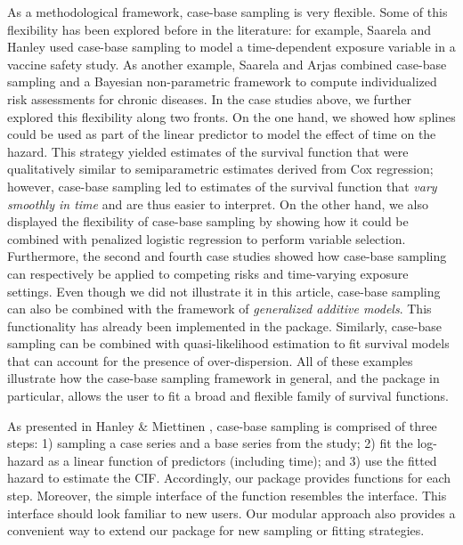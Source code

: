 As a methodological framework, case-base sampling is very flexible. Some
of this flexibility has been explored before in the literature: for
example, Saarela and Hanley \citeyearpar{saarela2015case} used case-base
sampling to model a time-dependent exposure variable in a vaccine safety
study. As another example, Saarela and Arjas
\citeyearpar{saarela2015non} combined case-base sampling and a Bayesian
non-parametric framework to compute individualized risk assessments for
chronic diseases. In the case studies above, we further explored this
flexibility along two fronts. On the one hand, we showed how splines
could be used as part of the linear predictor to model the effect of
time on the hazard. This strategy yielded estimates of the survival
function that were qualitatively similar to semiparametric estimates
derived from Cox regression; however, case-base sampling led to
estimates of the survival function that \emph{vary smoothly in time} and
are thus easier to interpret. On the other hand, we also displayed the
flexibility of case-base sampling by showing how it could be combined
with penalized logistic regression to perform variable selection.
Furthermore, the second and fourth case studies showed how case-base
sampling can respectively be applied to competing risks and time-varying
exposure settings. Even though we did not illustrate it in this article,
case-base sampling can also be combined with the framework of
\emph{generalized additive models}. This functionality has already been
implemented in the package. Similarly, case-base sampling can be
combined with quasi-likelihood estimation to fit survival models that
can account for the presence of over-dispersion. All of these examples
illustrate how the case-base sampling framework in general, and the
package  in particular, allows the user to fit a broad and
flexible family of survival functions.

As presented in Hanley \& Miettinen \citeyearpar{hanley2009fitting},
case-base sampling is comprised of three steps: 1) sampling a case
series and a base series from the study; 2) fit the log-hazard as a
linear function of predictors (including time); and 3) use the fitted
hazard to estimate the CIF. Accordingly, our package provides functions
for each step. Moreover, the simple interface of the
 function resembles the  interface.
This interface should look familiar to new users. Our modular approach
also provides a convenient way to extend our package for new sampling or
fitting strategies.

